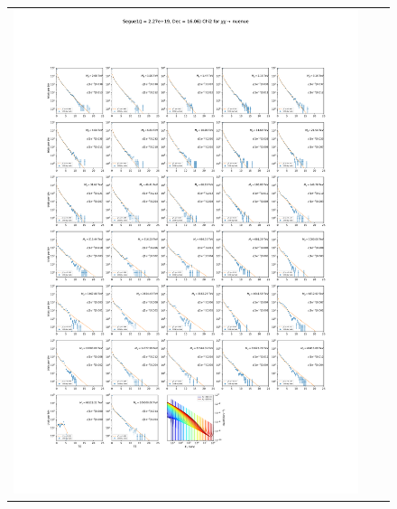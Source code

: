 \begin{figure}[t]
{\begin{tabular}{ccc}
            \includegraphics[clip, trim=22.1cm 6.5cm 19.5cm 56.5cm, scale=0.55]{figures/ic_DM/dm_plots/Segue1_nuenue_chi2_Masspanel_2024-03-23.pdf} &

\end{tabular}}
\end{figure}
